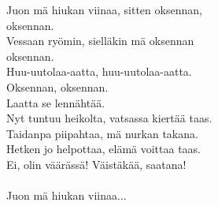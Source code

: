 
Juon mä hiukan viinaa, sitten oksennan, \\ oksennan. \\ Vessaan ryömin, sielläkin mä oksennan \\ oksennan. \\ Huu-uutolaa-aatta, huu-uutolaa-aatta. \\ Oksennan, oksennan. \\ Laatta se lennähtää. \\ Nyt tuntuu heikolta, vatsassa kiertää taas. \\ Taidanpa piipahtaa, mä nurkan takana. \\ Hetken jo helpottaa, elämä voittaa taas. \\ Ei, olin väärässä! Väistäkää, saatana! \\ \hspace{10mm} \\ Juon mä hiukan viinaa...